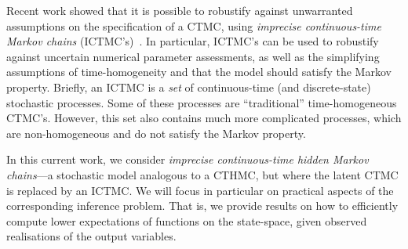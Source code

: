 \documentclass[twoside,11pt]{article}
\begin{document}
Recent work showed that it is possible to robustify against unwarranted assumptions on the specification of a CTMC, using \emph{imprecise continuous-time Markov chains} (ICTMC's)~\citep{Skulj:2015cq, krak2016ictmc}. In particular, ICTMC's can be used to robustify against uncertain numerical parameter assessments, as well as the simplifying assumptions of time-homogeneity and that the model should satisfy the Markov property. Briefly, an ICTMC is a \emph{set} of continuous-time (and discrete-state) stochastic processes. Some of these processes are ``traditional'' time-homogeneous CTMC's. However, this set also contains much more complicated processes, which are non-homogeneous and do not satisfy the Markov property.



In this current work, we consider \emph{imprecise continuous-time hidden Markov chains}---a stochastic model analogous to a CTHMC, but where the latent CTMC is replaced by an ICTMC. We will focus in particular on practical aspects of the corresponding inference problem. That is, we provide results on how to efficiently compute lower expectations of functions on the state-space, given observed realisations of the output variables.

\end{document}
